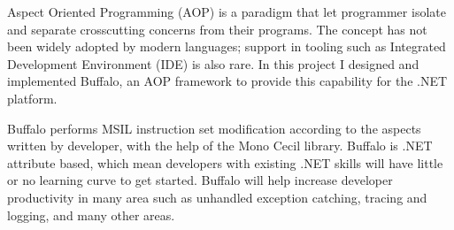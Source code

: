 \begin{abstractpage}
Aspect Oriented Programming (AOP) is a paradigm that let programmer isolate and separate crosscutting concerns from their programs. The concept has not been widely adopted by modern languages; support in tooling such as Integrated Development Environment (IDE) is also rare. In this project I designed and implemented Buffalo, an AOP framework to provide this capability for the .NET platform.

Buffalo performs MSIL instruction set modification according to the aspects written by developer, with the help of the Mono Cecil library. Buffalo is .NET attribute based, which mean developers with existing .NET skills will have little or no learning curve to get started. Buffalo will help increase developer productivity in many area such as unhandled exception catching, tracing and logging, and many other areas.
\end{abstractpage}
